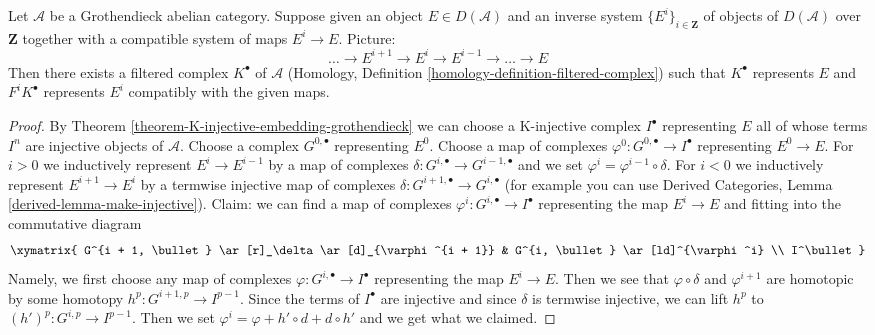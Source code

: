 \begin{lemma}
\label{lemma-represent-by-filtered-complex}
Let $\mathcal{A}$ be a Grothendieck abelian category. Suppose given an object
$E \in D(\mathcal{A})$ and an inverse system $\{E^i\}_{i \in \mathbf{Z}}$
of objects of $D(\mathcal{A})$ over $\mathbf{Z}$ together with
a compatible system of maps $E^i \to E$. Picture:
$$
\ldots \to E^{i + 1} \to E^i \to E^{i - 1} \to \ldots \to E
$$
Then there exists a filtered complex $K^\bullet$ of $\mathcal{A}$
(Homology, Definition \ref{homology-definition-filtered-complex})
such that $K^\bullet$ represents $E$
and $F^iK^\bullet$ represents $E^i$ compatibly with the given maps.
\end{lemma}

\begin{proof}
By Theorem \ref{theorem-K-injective-embedding-grothendieck}
we can choose a K-injective complex $I^\bullet$
representing $E$ all of whose terms $I^n$ are injective
objects of $\mathcal{A}$.
Choose a complex $G^{0, \bullet}$ representing $E^0$.
Choose a map of complexes $\varphi^0 : G^{0, \bullet} \to I^\bullet$
representing $E^0 \to E$.
For $i > 0$ we inductively represent $E^i \to E^{i - 1}$
by a map of complexes
$\delta : G^{i, \bullet} \to G^{i - 1, \bullet}$
and we set $\varphi^i = \varphi^{i - 1} \circ \delta$.
For $i < 0$ we inductively represent $E^{i + 1} \to E^i$
by a termwise injective map of complexes
$\delta : G^{i + 1, \bullet} \to G^{i, \bullet}$
(for example you can use
Derived Categories, Lemma \ref{derived-lemma-make-injective}).
Claim: we can find a map of complexes
$\varphi^i : G^{i, \bullet} \to I^\bullet$
representing the map $E^i \to E$ and
fitting into the commutative diagram
$$
\xymatrix{
G^{i + 1, \bullet} \ar[r]_\delta \ar[d]_{\varphi^{i + 1}} &
G^{i, \bullet} \ar[ld]^{\varphi^i} \\
I^\bullet
}
$$
Namely, we first choose any map of complexes
$\varphi : G^{i, \bullet} \to I^\bullet$
representing the map
$E^i \to E$. Then we see that $\varphi \circ \delta$
and $\varphi^{i + 1}$ are homotopic by some homotopy
$h^p : G^{i + 1, p} \to I^{p - 1}$.
Since the terms of
$I^\bullet$ are injective and since $\delta$
is termwise injective, we can lift $h^p$ to
$(h')^p : G^{i, p} \to I^{p - 1}$.
Then we set $\varphi^i = \varphi + h' \circ d + d \circ h'$
and we get what we claimed.


\end{proof}
